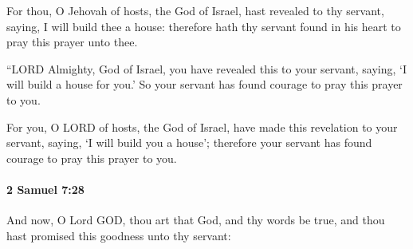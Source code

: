 			\begin{versebox}
					\item[BHS] 
					\item[ASV] For thou, O Jehovah of hosts, the God of Israel, hast revealed to thy servant, saying, I will build thee a house: therefore hath thy servant found in his heart to pray this prayer unto thee.
					\item[NIV] “LORD Almighty, God of Israel, you have revealed this to your servant, saying, ‘I will build a house for you.’ So your servant has found courage to pray this prayer to you.
					\item[NRSV] For you, O LORD of hosts, the God of Israel, have made this revelation to your servant, saying, ‘I will build you a house’; therefore your servant has found courage to pray this prayer to you.
			\end{versebox}

		\paragraph{2 Samuel 7:28} %
			\label{2SAMUEL-7-28}

			And now, O Lord GOD, thou art that God, and thy words be true, and thou hast promised this goodness unto thy servant:

